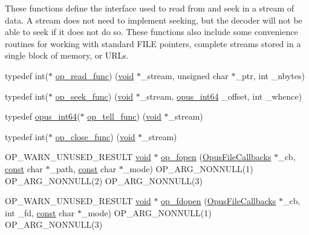 These functions define the interface used to read from and seek in a stream of data. A stream does not need to implement seeking, but the decoder will not be able to seek if it does not do so. These functions also include some convenience routines for working with standard {\ttfamily F\+I\+LE} pointers, complete streams stored in a single block of memory, or U\+R\+Ls. \begin{DoxyCompactItemize}
\item 
typedef int($\ast$ \hyperlink{group__stream__callbacks_ga9ffca429db1f3b77f2f303f1942188c3}{op\+\_\+read\+\_\+func}) (\hyperlink{png_8h_ac9c84fa68bbad002983e35ce3663c686}{void} $\ast$\+\_\+stream, unsigned char $\ast$\+\_\+ptr, int \+\_\+nbytes)
\item 
typedef int($\ast$ \hyperlink{group__stream__callbacks_gae57cb396d1f193d3f4e7e56ddad7760e}{op\+\_\+seek\+\_\+func}) (\hyperlink{png_8h_ac9c84fa68bbad002983e35ce3663c686}{void} $\ast$\+\_\+stream, \hyperlink{opus__types_8h_ab6742070cf9d0ccffca2b80522b4f41a}{opus\+\_\+int64} \+\_\+offset, int \+\_\+whence)
\item 
typedef \hyperlink{opus__types_8h_ab6742070cf9d0ccffca2b80522b4f41a}{opus\+\_\+int64}($\ast$ \hyperlink{group__stream__callbacks_gaca012812dea4bc3a27b0c23575efecaf}{op\+\_\+tell\+\_\+func}) (\hyperlink{png_8h_ac9c84fa68bbad002983e35ce3663c686}{void} $\ast$\+\_\+stream)
\item 
typedef int($\ast$ \hyperlink{group__stream__callbacks_ga16c914ec90d301f125cdbeaa1ff57c2d}{op\+\_\+close\+\_\+func}) (\hyperlink{png_8h_ac9c84fa68bbad002983e35ce3663c686}{void} $\ast$\+\_\+stream)
\item 
O\+P\+\_\+\+W\+A\+R\+N\+\_\+\+U\+N\+U\+S\+E\+D\+\_\+\+R\+E\+S\+U\+LT \hyperlink{png_8h_ac9c84fa68bbad002983e35ce3663c686}{void} $\ast$ \hyperlink{group__stream__callbacks_ga8b3714e33b1459b43445b99b55cbe75f}{op\+\_\+fopen} (\hyperlink{struct_opus_file_callbacks}{Opus\+File\+Callbacks} $\ast$\+\_\+cb, \hyperlink{zconf_8h_a2c212835823e3c54a8ab6d95c652660e}{const} char $\ast$\+\_\+path, \hyperlink{zconf_8h_a2c212835823e3c54a8ab6d95c652660e}{const} char $\ast$\+\_\+mode) O\+P\+\_\+\+A\+R\+G\+\_\+\+N\+O\+N\+N\+U\+LL(1) O\+P\+\_\+\+A\+R\+G\+\_\+\+N\+O\+N\+N\+U\+LL(2) O\+P\+\_\+\+A\+R\+G\+\_\+\+N\+O\+N\+N\+U\+LL(3)
\item 
O\+P\+\_\+\+W\+A\+R\+N\+\_\+\+U\+N\+U\+S\+E\+D\+\_\+\+R\+E\+S\+U\+LT \hyperlink{png_8h_ac9c84fa68bbad002983e35ce3663c686}{void} $\ast$ \hyperlink{group__stream__callbacks_gac1843b587e14570e616f8cc7c4501961}{op\+\_\+fdopen} (\hyperlink{struct_opus_file_callbacks}{Opus\+File\+Callbacks} $\ast$\+\_\+cb, int \+\_\+fd, \hyperlink{zconf_8h_a2c212835823e3c54a8ab6d95c652660e}{const} char $\ast$\+\_\+mode) O\+P\+\_\+\+A\+R\+G\+\_\+\+N\+O\+N\+N\+U\+LL(1) O\+P\+\_\+\+A\+R\+G\+\_\+\+N\+O\+N\+N\+U\+LL(3)

\end{DoxyCompactItemize}
